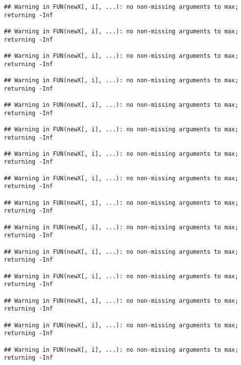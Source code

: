 \documentclass[]{article}
\begin{document}
\begin{verbatim}
## Warning in FUN(newX[, i], ...): no non-missing arguments to max; returning -Inf

## Warning in FUN(newX[, i], ...): no non-missing arguments to max; returning -Inf

## Warning in FUN(newX[, i], ...): no non-missing arguments to max; returning -Inf

## Warning in FUN(newX[, i], ...): no non-missing arguments to max; returning -Inf

## Warning in FUN(newX[, i], ...): no non-missing arguments to max; returning -Inf

## Warning in FUN(newX[, i], ...): no non-missing arguments to max; returning -Inf

## Warning in FUN(newX[, i], ...): no non-missing arguments to max; returning -Inf

## Warning in FUN(newX[, i], ...): no non-missing arguments to max; returning -Inf

## Warning in FUN(newX[, i], ...): no non-missing arguments to max; returning -Inf

## Warning in FUN(newX[, i], ...): no non-missing arguments to max; returning -Inf

## Warning in FUN(newX[, i], ...): no non-missing arguments to max; returning -Inf

## Warning in FUN(newX[, i], ...): no non-missing arguments to max; returning -Inf

## Warning in FUN(newX[, i], ...): no non-missing arguments to max; returning -Inf

## Warning in FUN(newX[, i], ...): no non-missing arguments to max; returning -Inf

## Warning in FUN(newX[, i], ...): no non-missing arguments to max; returning -Inf
\end{verbatim}
\end{document}

